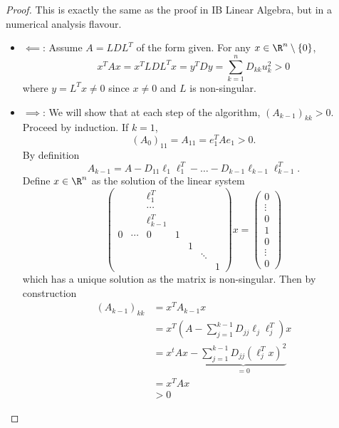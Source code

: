 \documentclass[a4paper]{article}
\begin{document}
\begin{proof}
  This is exactly the same as the proof in IB Linear Algebra, but in a numerical analysis flavour.
  \begin{itemize}
  \item \(\impliedby\): Assume \(A = LDL^T\) of the form given. For any \(x \in \R^n \setminus \{0\}\),
    \[
      x^TAx = x^TLDL^Tx = y^TDy = \sum_{k = 1}^n D_{kk}u_k^2 > 0
    \]
    where \(y = L^Tx \neq 0\) since \(x \neq 0\) and \(L\) is non-singular.
  \item \(\implies\): We will show that at each step of the algorithm, \((A_{k - 1})_{kk} > 0\). Proceed by induction. If \(k = 1\),
    \[
      (A_0)_{11} = A_{11} = e_1^TAe_1 > 0.
    \]
    By definition
    \[
      A_{k - 1} = A - D_{11}\ell_1\ell_1^T - \dots - D_{k - 1}\ell_{k - 1}\ell_{k - 1}^T.
    \]
    Define \(x \in \R^n\) as the solution of the linear system
    \[
      \begin{pmatrix}
        & & \ell_1^T \\
        & & \cdots \\
        & & \ell_{k - 1}^T \\
        0 & \cdots & 0 & 1 \\
        & & & & 1 \\
        & & & & & \ddots \\
        & & & & & & 1
      \end{pmatrix}
      x =
      \begin{pmatrix}
        0 \\
        \vdots \\
        0 \\
        1 \\
        0 \\
        \vdots \\
        0
      \end{pmatrix}
    \]
    which has a unique solution as the matrix is non-singular. Then by construction
    \begin{align*}
      (A_{k - 1})_{kk}
      &= x^TA_{k - 1}x \\
      &= x^T(A - \sum_{j = 1}^{k - 1}D_{jj}\ell_j\ell_j^T)x \\
      &= x^tAx - \underbrace{\sum_{j = 1}^{k - 1} D_{jj} (\ell_j^Tx)^2}_{= 0} \\
      &= x^TAx \\
      & > 0
    \end{align*}
  \end{itemize}
\end{proof}
\end{document}
